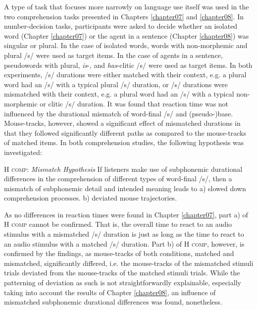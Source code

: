 A type of task that focuses more narrowly on language use itself was used in the two comprehension tasks presented in Chapters \ref{chapter07} and \ref{chapter08}. In number-decision tasks, participants were asked to decide whether an isolated word (Chapter \ref{chapter07}) or the agent in a sentence (Chapter \ref{chapter08}) was singular or plural. In the case of isolated words, words with non-morphemic and plural /s/ were used as target items. In the case of agents in a sentence, pseudowords with plural, \textit{is}-, and \textit{has}-clitic /s/ were used as target items. In both experiments, /s/ durations were either matched with their context, e.g. a plural word had an /s/ with a typical plural /s/ duration, or /s/ durations were mismatched with their context, e.g. a plural word had an /s/ with a typical non-morphemic or clitic /s/ duration. It was found that reaction time was not influenced by the durational mismatch of word-final /s/ and (pseudo-)base. Mouse-tracks, however, showed a significant effect of mismatched durations in that they followed significantly different paths as compared to the mouse-tracks of matched items. In both comprehension studies, the following hypothesis was investigated:

\begin{description}

\item\textsc{H comp}: \textit{Mismatch Hypothesis} \newline
If listeners make use of subphonemic durational differences in the comprehension of different types of word-final /s/, then a mismatch of subphonemic detail and intended meaning leads to\newline
a) slowed down comprehension processes.\newline
b) deviated mouse trajectories.

\end{description}

As no differences in reaction times were found in Chapter \ref{chapter07}, part a) of \textsc{H comp} cannot be confirmed. That is, the overall time to react to an audio stimulus with a mismatched /s/ duration is just as long as the time to react to an audio stimulus with a matched /s/ duration. Part b) of \textsc{H comp}, however, is confirmed by the findings, as mouse-tracks of both conditions, matched and mismatched, significantly differed, i.e. the mouse-tracks of the mismatched stimuli trials deviated from the mouse-tracks of the matched stimuli trials. While the patterning of deviation as such is not straightforwardly explainable, especially taking into account the results of Chapter \ref{chapter08}, an influence of mismatched subphonemic durational differences was found, nonetheless.

